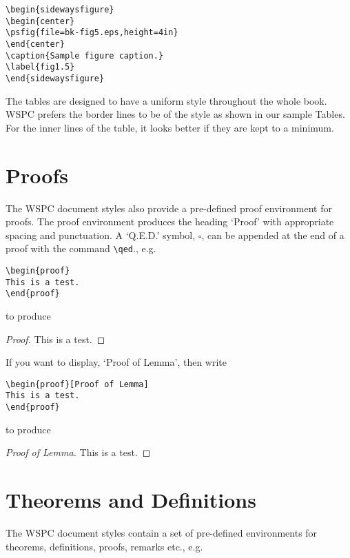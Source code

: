 \begin{verbatim}
\begin{sidewaysfigure}
\begin{center}
\psfig{file=bk-fig5.eps,height=4in}
\end{center}
\caption{Sample figure caption.}
\label{fig1.5}
\end{sidewaysfigure}
\end{verbatim}

The tables are designed to have a uniform style throughout the whole
book. WSPC prefers the border lines to be of the style as shown in our
sample Tables. For the inner lines of the table, it looks better if
they are kept to a minimum.

\section{Proofs}
The WSPC document styles also provide a pre-defined proof
environment for proofs. The proof environment produces the heading
`Proof' with appropriate spacing and punctuation. A `Q.E.D.' symbol,
$\square$, can be appended at the end of a proof with the command
\verb|\qed|., e.g.

\begin{verbatim}
\begin{proof}
This is a test.
\end{proof}
\end{verbatim}

\noindent to produce

\begin{proof}
This is a test.
\end{proof}

If you want to display, `Proof of Lemma', then write

\begin{verbatim}
\begin{proof}[Proof of Lemma]
This is a test.
\end{proof}
\end{verbatim}

\noindent to produce

\begin{proof}[Proof of Lemma]
This is a test.
\end{proof}

\section{Theorems and Definitions}
The WSPC document styles contain a set of pre-defined
environments for theorems, definitions, proofs, remarks etc., e.g.

